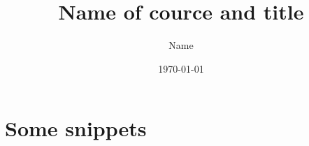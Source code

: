 \documentclass[11pt, a4paper]{article}
\author{Name}
\title{Name of cource and title}
\date{\today}
\begin{document}
\maketitle

\section{Some snippets}

\clearpage



 
 
\end{document}
